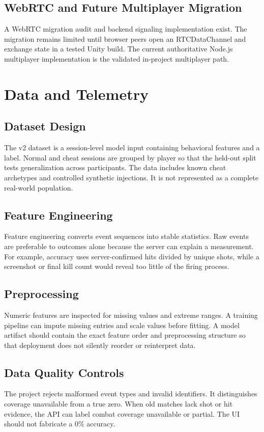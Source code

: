 \documentclass[12pt,a4paper,oneside]{report}
\begin{document}
\section{WebRTC and Future Multiplayer Migration}
A WebRTC migration audit and backend signaling implementation exist. The migration remains limited until browser peers open an RTCDataChannel and exchange state in a tested Unity build. The current authoritative Node.js multiplayer implementation is the validated in-project multiplayer path.

\chapter{Data and Telemetry}
\section{Dataset Design}
The v2 dataset is a session-level model input containing behavioral features and a label. Normal and cheat sessions are grouped by player so that the held-out split tests generalization across participants. The data includes known cheat archetypes and controlled synthetic injections. It is not represented as a complete real-world population.

\section{Feature Engineering}
Feature engineering converts event sequences into stable statistics. Raw events are preferable to outcomes alone because the server can explain a measurement. For example, accuracy uses server-confirmed hits divided by unique shots, while a screenshot or final kill count would reveal too little of the firing process.

\section{Preprocessing}
Numeric features are inspected for missing values and extreme ranges. A training pipeline can impute missing entries and scale values before fitting. A model artifact should contain the exact feature order and preprocessing structure so that deployment does not silently reorder or reinterpret data.

\section{Data Quality Controls}
The project rejects malformed event types and invalid identifiers. It distinguishes coverage unavailable from a true zero. When old matches lack shot or hit evidence, the API can label combat coverage unavailable or partial. The UI should not fabricate a 0\% accuracy.
\end{document}
